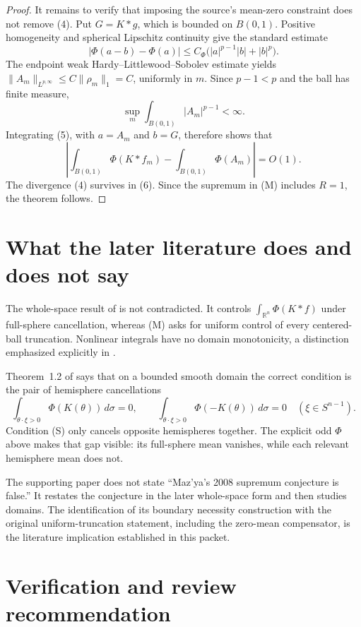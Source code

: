 \documentclass[11pt]{article}
\newcommand{\Rn}{\mathbb R^n}
\begin{document}
\begin{proof}
It remains to verify that imposing the source's mean-zero constraint does
not remove (4).  Put $G=K*g$, which is bounded on $B(0,1)$.  Positive
homogeneity and spherical Lipschitz continuity give the standard estimate
\[
 |\Phi(a-b)-\Phi(a)|
 \le C_\Phi\bigl(|a|^{p-1}|b|+|b|^p\bigr).                          \tag{5}
\]
The endpoint weak Hardy--Littlewood--Sobolev estimate yields
$\|A_m\|_{L^{p,\infty}}\le C\|\rho_m\|_1=C$, uniformly in $m$.
Since $p-1<p$ and the ball has finite measure,
\[
 \sup_m\int_{B(0,1)}|A_m|^{p-1}<\infty.
\]
Integrating (5), with $a=A_m$ and $b=G$, therefore shows that
\[
 \left|\int_{B(0,1)}\Phi(K*f_m)-
                 \int_{B(0,1)}\Phi(A_m)\right|=O(1).               \tag{6}
\]
The divergence (4) survives in (6).  Since the supremum in (M) includes
$R=1$, the theorem follows.
\end{proof}

\section*{What the later literature does and does not say}

The whole-space result of \cite{WholeSpace} is not contradicted.  It controls
$\int_{\Rn}\Phi(K*f)$ under full-sphere cancellation, whereas (M) asks for
uniform control of every centered-ball truncation.  Nonlinear integrals have
no domain monotonicity, a distinction emphasized explicitly in
\cite{Domains}.

Theorem~1.2 of \cite{Domains} says that on a bounded smooth domain the
correct condition is the pair of hemisphere cancellations
\[
 \int_{\theta\cdot\xi>0}\Phi(K(\theta))\,d\sigma=0,
 \qquad
 \int_{\theta\cdot\xi>0}\Phi(-K(\theta))\,d\sigma=0
 \quad(\xi\in S^{n-1}).
\]
Condition (S) only cancels opposite hemispheres together.  The explicit odd
$\Phi$ above makes that gap visible: its full-sphere mean vanishes, while
each relevant hemisphere mean does not.

The supporting paper does not state ``Maz'ya's 2008 supremum conjecture is
false.''  It restates the conjecture in the later whole-space form and then
studies domains.  The identification of its boundary necessity construction
with the original uniform-truncation statement, including the zero-mean
compensator, is the literature implication established in this packet.

\section*{Verification and review recommendation}
\end{document}
